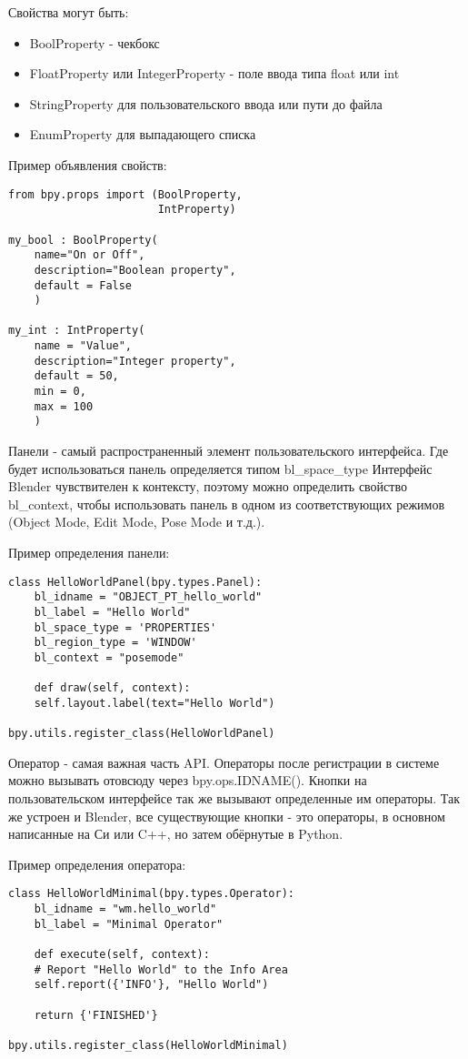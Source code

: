 Свойства могут быть:
\begin{itemize}
	\item BoolProperty - чекбокс
	\item FloatProperty или IntegerProperty - поле ввода типа float или int
	\item StringProperty для пользовательского ввода или пути до файла
	\item EnumProperty для выпадающего списка
\end{itemize}

Пример объявления свойств:

\begin{lstlisting}
from bpy.props import (BoolProperty,
					   IntProperty)

my_bool : BoolProperty(
	name="On or Off",
	description="Boolean property",
	default = False
	)

my_int : IntProperty(
	name = "Value",
	description="Integer property",
	default = 50,
	min = 0,
	max = 100
	)
\end{lstlisting}

Панели -  самый распространенный элемент пользовательского интерфейса. Где будет использоваться панель определяется типом bl\_space\_type Интерфейс Blender чувствителен к контексту, поэтому можно определить свойство bl\_context, чтобы использовать панель в одном из соответствующих режимов (Object Mode, Edit Mode, Pose Mode и т.д.).

Пример определения панели:
\begin{lstlisting}
class HelloWorldPanel(bpy.types.Panel):
	bl_idname = "OBJECT_PT_hello_world"
	bl_label = "Hello World"
	bl_space_type = 'PROPERTIES'
	bl_region_type = 'WINDOW'
	bl_context = "posemode"
	
	def draw(self, context):
	self.layout.label(text="Hello World")

bpy.utils.register_class(HelloWorldPanel)
\end{lstlisting}

Оператор - самая важная часть API. Операторы после регистрации в системе можно вызывать отовсюду через bpy.ops.IDNAME(). Кнопки на пользовательском интерфейсе так же вызывают определенные им операторы. Так же устроен и Blender, все существующие кнопки - это операторы, в основном написанные на Си или C++, но затем обёрнутые в Python.

Пример определения оператора:
\begin{lstlisting}
class HelloWorldMinimal(bpy.types.Operator):
	bl_idname = "wm.hello_world"
	bl_label = "Minimal Operator"
	
	def execute(self, context):
	# Report "Hello World" to the Info Area
	self.report({'INFO'}, "Hello World")
	
	return {'FINISHED'}
	
bpy.utils.register_class(HelloWorldMinimal)
\end{lstlisting}

